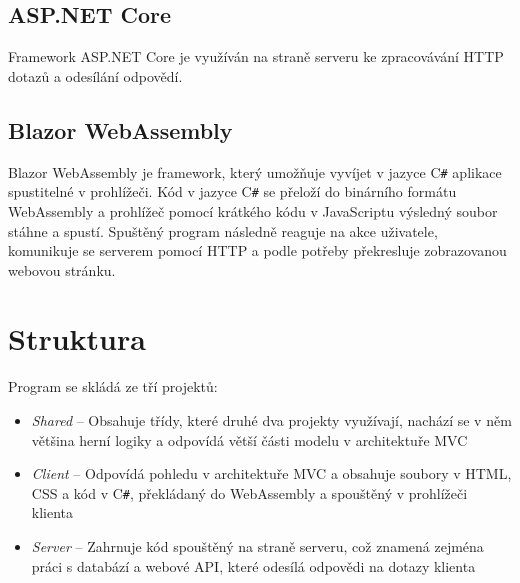 \documentclass[a4paper,12pt]{article}
\def\CS{C\texttt{\#}}
\begin{document}
\subsection{ASP.NET Core}
Framework ASP.NET Core je využíván na straně serveru ke zpracovávání HTTP dotazů a odesílání odpovědí.
\subsection{Blazor WebAssembly}
Blazor WebAssembly je framework, který umožňuje vyvíjet v jazyce  \CS{} aplikace spustitelné v prohlížeči. Kód v jazyce  \CS{} se přeloží do binárního formátu WebAssembly a prohlížeč pomocí krátkého kódu v JavaScriptu výsledný soubor stáhne a spustí. Spuštěný program následně reaguje na akce uživatele, komunikuje se serverem pomocí HTTP a podle potřeby překresluje zobrazovanou webovou stránku.

\section{Struktura}
Program se skládá ze tří projektů:
\begin{itemize}
\item\textit{Shared} -- Obsahuje třídy, které druhé dva projekty využívají, nachází se v něm většina herní logiky a odpovídá větší části modelu v architektuře MVC\cite{mvc}
\item\textit{Client} -- Odpovídá pohledu v architektuře MVC a obsahuje soubory v HTML, CSS a kód v  \CS{}, překládaný do WebAssembly a spouštěný v prohlížeči klienta
\item\textit{Server} -- Zahrnuje kód spouštěný na straně serveru, což znamená zejména práci s databází a webové API, které odesílá odpovědi na dotazy klienta
\end{itemize}
\end{document}
